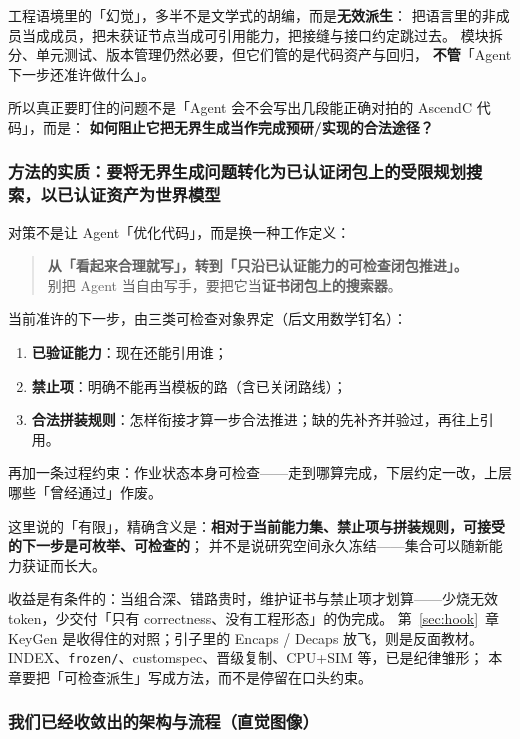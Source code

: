 \documentclass[UTF8,a4paper,11pt]{ctexart}
\theoremstyle{definition}
\theoremstyle{plain}
\theoremstyle{remark}
\numberwithin{figure}{section}
\numberwithin{table}{section}
\begin{document}
工程语境里的「幻觉」，多半不是文学式的胡编，而是\textbf{无效派生}：
把语言里的非成员当成成员，把未获证节点当成可引用能力，把接缝与接口约定跳过去。
模块拆分、单元测试、版本管理仍然必要，但它们管的是代码资产与回归，
\textbf{不管}「Agent 下一步还准许做什么」。

所以真正要盯住的问题不是「Agent 会不会写出几段能正确对拍的 AscendC 代码」，而是：
\textbf{如何阻止它把无界生成当作完成预研/实现的合法途径？}

\subsubsection{方法的实质：要将无界生成问题转化为已认证闭包上的受限规划搜索，以已认证资产为世界模型}

对策不是让 Agent「优化代码」，而是换一种工作定义：

\begin{quote}
\noindent
\textbf{从「看起来合理就写」，转到「只沿已认证能力的可检查闭包推进」。}\\
别把 Agent 当自由写手，要把它当\textbf{证书闭包上的搜索器}。
\end{quote}

当前准许的下一步，由三类可检查对象界定（后文用数学钉名）：

\begin{enumerate}
  \item \textbf{已验证能力}：现在还能引用谁；
  \item \textbf{禁止项}：明确不能再当模板的路（含已关闭路线）；
  \item \textbf{合法拼装规则}：怎样衔接才算一步合法推进；缺的先补齐并验过，再往上引用。
\end{enumerate}

再加一条过程约束：作业状态本身可检查——走到哪算完成，下层约定一改，上层哪些「曾经通过」作废。

这里说的「有限」，精确含义是：\textbf{相对于当前能力集、禁止项与拼装规则，可接受的下一步是可枚举、可检查的}；
并不是说研究空间永久冻结——集合可以随新能力获证而长大。

收益是有条件的：当组合深、错路贵时，维护证书与禁止项才划算——少烧无效 token，少交付「只有 correctness、没有工程形态」的伪完成。
第~\ref{sec:hook}~章 KeyGen 是收得住的对照；引子里的 Encaps / Decaps 放飞，则是反面教材。
INDEX、\texttt{frozen/}、customspec、晋级复制、CPU+SIM 等，已是纪律雏形；
本章要把「可检查派生」写成方法，而不是停留在口头约束。

\subsubsection{我们已经收敛出的架构与流程（直觉图像）}
\end{document}
